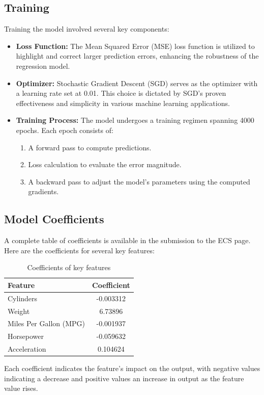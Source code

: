 \documentclass[11pt,a4paper]{article}
\begin{document}
\subsection*{Training}
Training the model involved several key components:
\begin{itemize}
    \item \textbf{Loss Function:} The Mean Squared Error (MSE) loss function is utilized to highlight and correct larger prediction errors, enhancing the robustness of the regression model.
    \item \textbf{Optimizer:} Stochastic Gradient Descent (SGD) serves as the optimizer with a learning rate set at 0.01. This choice is dictated by SGD's proven effectiveness and simplicity in various machine learning applications.
    \item \textbf{Training Process:} The model undergoes a training regimen spanning 4000 epochs. Each epoch consists of:
          \begin{enumerate}
              \item A forward pass to compute predictions.
              \item Loss calculation to evaluate the error magnitude.
              \item A backward pass to adjust the model's parameters using the computed gradients.
          \end{enumerate}
\end{itemize}

\subsection{Model Coefficients}
A complete table of coefficients is available in the submission to the ECS page. Here are the coefficients for several key features:

\begin{table}[ht]
    \centering
    \begin{tabular}{lc}
        \toprule
        Feature                & Coefficient \\
        \midrule
        Cylinders              & -0.003312   \\
        Weight                 & 6.73896     \\
        Miles Per Gallon (MPG) & -0.001937   \\
        Horsepower             & -0.059632   \\
        Acceleration           & 0.104624    \\
        \bottomrule
    \end{tabular}
    \caption{Coefficients of key features}
    \label{tab:coefficients}
\end{table}
\noindent
Each coefficient indicates the feature's impact on the output, with negative values indicating a decrease and positive values an increase in output as the feature value rises.
\end{document}
